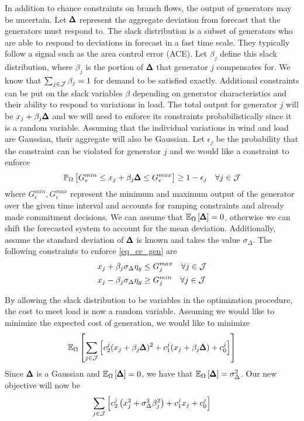 In addition to chance constraints on branch flows, the output of generators may be uncertain.  Let $\pmb{\Delta}$ represent the aggregate deviation from forecast that the generators must respond to.   The slack distribution is a subset of generators who are able to respond to deviations in forecast in a fast time scale.  They typically follow a signal such as the area control error (ACE).  Let $\beta_j$ define this slack distribution, where $\beta_j$ is the portion of $\pmb{\Delta}$ that generator $j$ compensates for.  We know that $\sum_{j \in \mathcal{J}} \beta_j =1$ for demand to be satisfied exactly.  Additional constraints can be put on the slack variables $\beta$ depending on generator characteristics and their ability to respond to variations in load.  The total output for generator $j$ will be $x_j + \beta_j \pmb{\Delta} $
and we will need to enforce its constraints probabilistically since it is a random variable.  Assuming that the individual variations in wind and load are Gaussian, their aggregate will also be Gaussian.   Let $\epsilon_j$ be the probability that the constraint can be violated for generator $j$ and we would like a constraint to enforce
\begin{equation}\label{eq_cc_gen}
\bP{\Omega}{ G^{min}_e \leq x_j + \beta_j \rD  \leq G^{max}_e } \geq 1 - \epsilon_j \hspace{10px} \forall j \in \cJ 
\end{equation}
where $G^{min}_e, G^{max}_e$ represent the minimum and maximum output of the generator over the given time interval and accounts for ramping constraints and already made commitment decisions. We can assume that $\mathbb{E}_{\Omega} \left[ \pmb{\Delta} \right] = 0$, otherwise we can shift the forecasted system to account for the mean deviation.  Additionally, assume the standard deviation of $\pmb{\Delta}$ is known and takes the value $\sigma_\Delta$.  The following constraints to enforce \cref{eq_cc_gen} are
\begin{align*}
x_j + \beta_j \sigma_\Delta \eta_g &\leq G^{max}_j \hspace{10px} \forall j \in \cJ \\
x_j - \beta_j \sigma_\Delta \eta_g &\geq G^{min}_j \hspace{10px} \forall j \in \cJ 
\end{align*}

By allowing the slack distribution to be variables in the optimization procedure, the cost to meet load is now a random variable.  Assuming we would like to minimize the expected cost of generation, we would like to minimize
\begin{equation*}
\mathbb{E}_{\Omega} \left[  \sum_{j \in \mathcal{J}} \left[ c^j_2 (x_j+\beta_j \pmb{\Delta})^2 + c^j_1 (x_j + \beta_j \pmb{\Delta}) + c_0^j \right]  \right]
\end{equation*}
Since $\pmb{\Delta}$ is a Gaussian and $\mathbb{E}_{\Omega} \left[ \pmb{\Delta} \right] = 0$, we have that $\mathbb{E}_{\Omega} \left[ \pmb{\Delta} \right] = \sigma_\Delta^2$.  Our new objective will now be
\begin{equation*}
\sum_{j \in \mathcal{J}} \left[  c_2^j \left(x_j^2 + \sigma_\Delta^2 \beta_j^2 \right) + c^j_1 x_j + c^j_0 \right]
\end{equation*}

